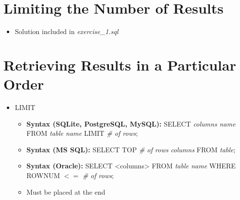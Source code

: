 \documentclass[12pt]{article}
\begin{document}
\bigskip

\section{Limiting the Number of Results}

\bigskip

\begin{itemize}
    \item Solution included in \textit{exercise\_1.sql}
\end{itemize}

\bigskip

\section{Retrieving Results in a Particular Order}

\bigskip

\begin{itemize}
    \item LIMIT
    \begin{itemize}
        \item \textbf{Syntax (SQLite, PostgreSQL, MySQL):} SELECT \textit{columns name} FROM \textit{table name} LIMIT \textit{\# of rows};
        \item \textbf{Syntax (MS SQL):} SELECT TOP \textit{\# of rows} \textit{columns} FROM \textit{table};
        \item \textbf{Syntax (Oracle):} SELECT <columns> FROM \textit{table name} WHERE ROWNUM $<=$ \textit{\# of rows};
        \item Must be placed at the end
    \end{itemize}
\end{itemize}
\end{document}
